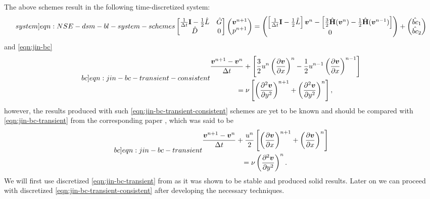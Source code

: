 \documentclass{article}
\begin{document}
The above schemes result in the following time-discretized system:
\begin{equation}\label[system]{eqn:NSE-dsm-bl-system-schemes}
	\begin{bmatrix}
		\frac{1}{\Delta t}\mathbf{I}-\frac{1}{2}\hat{L} & \hat{G} \\
		\hat{D} & 0
	\end{bmatrix}
	\begin{pmatrix}
		\boldsymbol{v}^{n+1} \\ 
		p^{n+1}
	\end{pmatrix}
	=
	\begin{pmatrix}
		\left[\frac{1}{\Delta t}\mathbf{I}-\frac{1}{2}\hat{L}\right] \boldsymbol{v}^n - \left[\frac{3}{2}\hat{\mathbf{H}}(\boldsymbol{v}^n) - \frac{1}{2}\hat{\mathbf{H}}(\boldsymbol{v}^{n-1})\right]\\
		0
	\end{pmatrix}
	+
	\begin{pmatrix}
		\hat{bc}_1\\
		\hat{bc}_2
	\end{pmatrix}
\end{equation}
and \cref{eqn:jin-bc} 
\begin{equation}\label[bc]{eqn:jin-bc-transient-consistent}
\begin{gathered}
\frac{\boldsymbol{v}^{n+1}-\boldsymbol{v}^n}{\Delta t}+\left[\frac{3}{2}{u^n}\left(\frac{\partial \boldsymbol{v}}{\partial x}\right)^{n}-\frac{1}{2}{u^{n-1}}\left(\frac{\partial \boldsymbol{v}}{\partial x}\right)^{n-1}\right] \\
=\nu\left[\left(\frac{\partial^2 \boldsymbol{v}}{\partial y^2}\right)^{n+1}+\left(\frac{\partial^2 \boldsymbol{v}}{\partial y^2}\right)^{n}\right],
\end{gathered}
\end{equation}
however, the results produced with such \cref{eqn:jin-bc-transient-consistent} schemes are yet to be known and should be compared with \cref{eqn:jin-bc-transient} from the corresponding paper \cite{Jin:1993}, which was said to be 
\begin{equation}\label[bc]{eqn:jin-bc-transient}
\begin{gathered}
\frac{\boldsymbol{v}^{n+1}-\boldsymbol{v}^n}{\Delta t}+\frac{u^n}{2}\left[\left(\frac{\partial \boldsymbol{v}}{\partial x}\right)^{n+1}+\left(\frac{\partial \boldsymbol{v}}{\partial x}\right)^n\right] \\
=\nu\left(\frac{\partial^2 \boldsymbol{v}}{\partial y^2}\right)^n.
\end{gathered}
\end{equation}
We will first use discretized \cref{eqn:jin-bc-transient} from \cite{Jin:1993} as it was shown to be stable and produced solid results. Later on we can proceed with discretized \cref{eqn:jin-bc-transient-consistent} after developing the necessary techniques.
\end{document}
